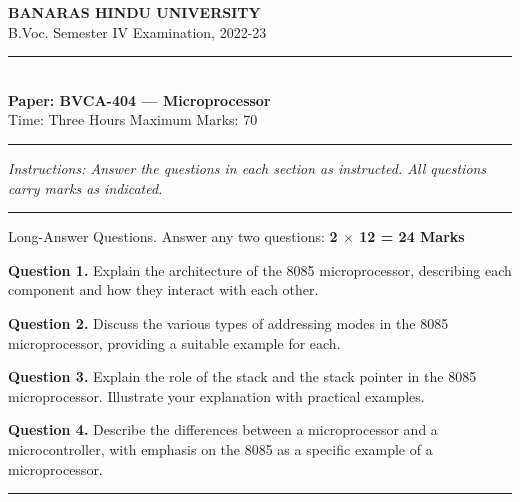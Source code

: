 \documentclass[11pt,a4paper]{article}
\begin{document}
\begin{center}
  {\large\bfseries BANARAS HINDU UNIVERSITY}\\[2pt]
  {\normalsize B.Voc. Semester IV Examination, 2022-23}\\[6pt]
  \rule{0.8\linewidth}{0.5pt}\\[6pt]
  {\large\bfseries Paper: BVCA-404 --- Microprocessor}\\[4pt]
  {\normalsize Time: Three Hours \hfill Maximum Marks: 70}
\end{center}

\rule{\linewidth}{0.4pt}

\smallskip



\noindent   \textit{Instructions: Answer the questions in each section as instructed. All questions carry marks as indicated.}

\bigskip




\rule{\linewidth}{0.4pt}\smallskip

Long-Answer Questions. Answer any two questions: \hfill   \textbf{2 $ \times$ 12 = 24 Marks}

\medskip



\noindent   \textbf{Question 1.} Explain the architecture of the 8085 microprocessor, describing each component and how they interact with each other.

\medskip



\noindent   \textbf{Question 2.} Discuss the various types of addressing modes in the 8085 microprocessor, providing a suitable example for each.

\medskip



\noindent   \textbf{Question 3.} Explain the role of the stack and the stack pointer in the 8085 microprocessor. Illustrate your explanation with practical examples.

\medskip



\noindent   \textbf{Question 4.} Describe the differences between a microprocessor and a microcontroller, with emphasis on the 8085 as a specific example of a microprocessor.

\bigskip


\rule{\linewidth}{0.4pt}\smallskip
\end{document}
